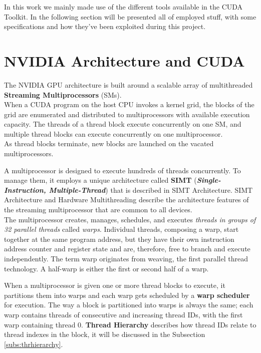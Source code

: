 In this work we mainly made use of the different tools available in the CUDA Toolkit. In the following section will be presented all of employed stuff, with some specifications and how they've been exploited during this project.

\section{NVIDIA Architecture and CUDA}
	The NVIDIA GPU architecture is built around a scalable array of multithreaded \textbf{Streaming Multiprocessors} (SMs).\\
	When a CUDA program on the host CPU invokes a kernel grid, the blocks of the grid are enumerated and distributed to multiprocessors with available execution capacity. The threads of a thread block execute concurrently on one SM, and multiple thread blocks can execute concurrently on one multiprocessor.\\
	As thread blocks terminate, new blocks are launched on the vacated multiprocessors.
	
	A multiprocessor is designed to execute hundreds of threads concurrently. To manage them, it employs a unique architecture called \textbf{SIMT} (\textbf{\textit{Single-Instruction, Multiple-Thread}}) that is described in SIMT Architecture.
	SIMT Architecture and Hardware Multithreading describe the architecture features of the streaming multiprocessor that are common to all devices. \\
	
	The multiprocessor creates, manages, schedules, and executes \textit{threads in groups of 32 parallel threads} called \textit{warps}. Individual threads, composing a warp, start together at the same program address, but they have their own instruction address counter and register state and are, therefore, free to branch and execute independently. The term warp originates from weaving, the first parallel thread technology. A half-warp is either the first or second half of a warp.
	
	When a multiprocessor is given one or more thread blocks to execute, it partitions them into warps and each warp gets scheduled by a \textbf{warp scheduler} for execution. The way a block is partitioned into warps is always the same; each warp contains threads of consecutive and increasing thread IDs, with the first warp containing thread 0. \textbf{Thread Hierarchy} describes how thread IDs relate to thread indexes in the block, it will be discussed in the Subsection \ref{subs:thrhierarchy}.
	
